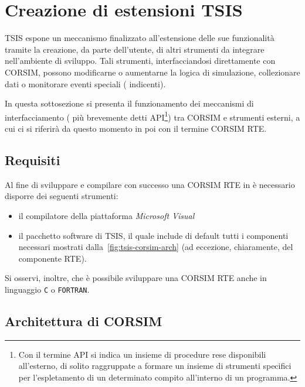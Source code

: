 \section{Creazione di estensioni TSIS}
\acs{TSIS} espone un meccanismo finalizzato all'estensione delle sue funzionalità tramite la creazione, da parte dell'utente, di altri strumenti da integrare nell'ambiente di sviluppo. Tali strumenti, interfacciandosi direttamente con \acs{CORSIM}, possono modificarne o aumentarne la logica di simulazione, collezionare dati o monitorare eventi speciali (\eg{} indicenti).

In questa sottosezione si presenta il funzionamento dei meccanismi di interfacciamento (\ie{} più brevemente detti \acs{API}\footnote{Con il termine
\acf{API} si indica un insieme di procedure rese disponibili all'esterno, di solito raggruppate a formare un insieme di strumenti specifici per l'espletamento di un determinato compito all'interno di un programma.}) tra \acs{CORSIM} e strumenti esterni, a cui ci si riferirà da questo momento in poi con il termine \acs{CORSIM} \acs{RTE}.

\subsection{Requisiti}
Al fine di sviluppare e compilare con successo una \acs{CORSIM} \acs{RTE} in \CC{} è necessario disporre dei seguenti strumenti:
\begin{itemize}
    \item il compilatore della piattaforma \emph{Microsoft Visual \CC{}}
    \item il pacchetto software di \acs{TSIS}, il quale include di default tutti i componenti necessari mostrati dalla~\vref{fig:tsis-corsim-arch} (ad eccezione, chiaramente, del componente \acs{RTE}).
\end{itemize}
Si osservi, inoltre, che è possibile sviluppare una \acs{CORSIM} \acs{RTE} anche in linguaggio \lstinline[]|C| o \lstinline[]|FORTRAN|.

\subsection{Architettura di CORSIM}

